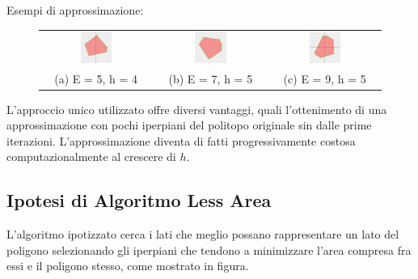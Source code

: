 \begin{center}
    Esempi di approssimazione:
\end{center}
\begin{figure}[H]
    \centering
    \begin{tabular}{ccc}
        \includegraphics[width=0.3\textwidth]{media/BoxCutting/5_4.png} &
        \includegraphics[width=0.3\textwidth]{media/BoxCutting/7_5.png} &
        \includegraphics[width=0.3\textwidth]{media/BoxCutting/9_5.png} \\
        (a) E = 5, h = 4 & (b) E = 7, h = 5 & (c) E = 9, h = 5
    \end{tabular}
\end{figure}

L'approccio unico utilizzato offre diversi vantaggi, quali l'ottenimento di una approssimazione
con pochi iperpiani del politopo originale sin dalle prime iterazioni.
L'approssimazione diventa di fatti progressivamente costosa computazionalmente al crescere
di $h$.


\subsection{Ipotesi di Algoritmo Less Area}

L'algoritmo ipotizzato cerca i lati che meglio possano rappresentare un lato del poligono 
selezionando gli iperpiani che tendono a minimizzare l'area compresa fra essi e il poligono stesso, 
come mostrato in figura.

